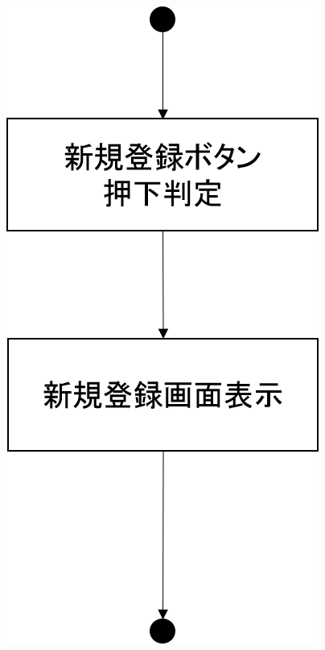 \begin{figure}[htbp]
 \begin{minipage}{0.5\hsize}
  \begin{center}
   \includegraphics[width=0.5\linewidth,clip]{./img/create_account/sub1.png}
  \end{center}
 \end{minipage}
 \begin{minipage}{0.5\hsize}
  \begin{center}

\end{center}
\end{minipage}
\end{figure}
